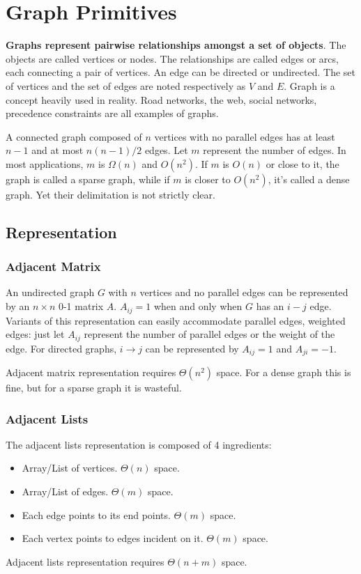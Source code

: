 \ifx\PREAMBLE\undefined


\fi
\chapter{Graph Primitives}
\textbf{Graphs represent pairwise relationships amongst a set of objects}. The objects are called vertices or nodes. The relationships are called edges or arcs, each connecting a pair of vertices. An edge can be directed or undirected. The set of vertices and the set of edges are noted respectively as $V$ and $E$. Graph is a concept heavily used in reality. Road networks, the web, social networks, precedence constraints are all examples of graphs.

A connected graph composed of $n$ vertices with no parallel edges has at least $n-1$ and at most $n(n-1)/2$ edges. Let $m$ represent the number of edges. In most applications, $m$ is $\Omega(n)$ and $O(n^2)$. If $m$ is $O(n)$ or close to it, the graph is called a sparse graph, while if $m$ is closer to $O(n^2)$, it's called a dense graph. Yet their delimitation is not strictly clear. 
\section{Representation}
\subsection{Adjacent Matrix}
An undirected graph $G$ with $n$ vertices and no parallel edges can be represented by an $n\times n$ 0-1 matrix $A$. $A_{ij}=1$ when and only when $G$ has an $i-j$ edge. Variants of this representation can easily accommodate parallel edges, weighted edges: just let $A_{ij}$ represent the number of parallel edges or the weight of the edge. For directed graphs, $i\rightarrow j$ can be represented by $A_{ij}=1$ and $A_{ji}=-1$.

Adjacent matrix representation requires $\Theta(n^2)$ space. For a dense graph this is fine, but for a sparse graph it is wasteful. 
\subsection{Adjacent Lists}
The adjacent lists representation is composed of 4 ingredients:
\begin{itemize}
\item Array/List of vertices. $\Theta(n)$ space.
\item Array/List of edges. $\Theta(m)$ space.
\item Each edge points to its end points. $\Theta(m)$ space.
\item Each vertex points to edges incident on it. $\Theta(m)$ space.
\end{itemize}
Adjacent lists representation requires $\Theta(n+m)$ space. 

